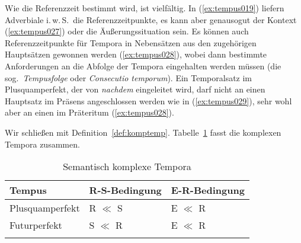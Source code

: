 
Wie die Referenzzeit bestimmt wird, ist vielfältig.
In (\ref{ex:tempus019}) liefern Adverbiale i.\,w.\,S.\ die Referenzzeitpunkte, es kann aber genausogut der Kontext (\ref{ex:tempus027}) oder die Äußerungssituation sein.
Es können auch Referenzzeitpunkte für Tempora in Nebensätzen aus den zugehörigen Hauptsätzen gewonnen werden (\ref{ex:tempus028}), wobei dann bestimmte Anforderungen an die Abfolge der Tempora eingehalten werden müssen (die sog.\ \textit{Tempusfolge} oder \textit{Consecutio temporum}).
Ein Temporalsatz im Plusquamperfekt, der von \textit{nachdem} eingeleitet wird, darf \zB nicht an einen Hauptsatz im Präsens angeschlossen werden wie in (\ref{ex:tempus029}), sehr wohl aber an einen im Präteritum (\ref{ex:tempus028}).

\begin{exe}
  \ex\label{ex:tempus026}
  \begin{xlist}
  \end{xlist}
\end{exe}

Wir schließen mit Definition~\ref{def:komptemp}.
Tabelle~\ref{tab:tempus030} fasst die komplexen Tempora zusammen.

\Stretch


\begin{table}[!htbp]
  \centering
  \begin{tabular}{lll}
    \lsptoprule
    \textbf{Tempus} & \textbf{R-S-Bedingung} & \textbf{E-R-Bedingung} \\
    \midrule
    Plusquamperfekt & R $\ll$ S & E $\ll$ R \\
    Futurperfekt & S $\ll$ R & E $\ll$ R \\
    \lspbottomrule
  \end{tabular}
  \caption{Semantisch komplexe Tempora}
  \label{tab:tempus030}
\end{table}

